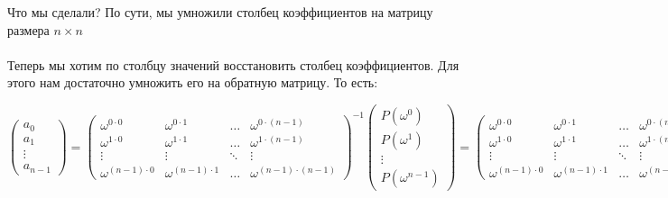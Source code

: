 Что мы сделали? По сути, мы умножили столбец коэффициентов на матрицу размера $n\times n$
\\
\\
Теперь мы хотим по столбцу значений восстановить столбец коэффициентов. Для этого нам достаточно умножить его на обратную матрицу. То есть: 
\begin{center}
 $\left( \begin{matrix} a_0 \\ a_1 \\ \vdots \\ a_{n-1} \end{matrix}\right)  = \left( \begin{matrix} \omega^{0 \cdot 0} & \omega^{0 \cdot 1} & \dots & \omega^{0 \cdot (n - 1)} \\ \omega^{1 \cdot 0} & \omega^{1 \cdot 1} & \dots & \omega^{1 \cdot (n - 1)} \\ \vdots & \vdots & \ddots & \vdots \\ \omega^{(n - 1) \cdot 0} & \omega^{(n - 1) \cdot 1} & \dots & \omega^{(n - 1) \cdot (n - 1)}   \end{matrix} \right)^{-1}\left( \begin{matrix} P(\omega^0) \\P(\omega^1) \\ \vdots \\ P(\omega^{n-1}) \end{matrix}\right) = \left( \begin{matrix} \omega^{0 \cdot 0} & \omega^{0 \cdot 1} & \dots & \omega^{0 \cdot (n - 1)} \\ \omega^{1 \cdot 0} & \omega^{1 \cdot 1} & \dots & \omega^{1 \cdot (n - 1)} \\ \vdots & \vdots & \ddots & \vdots \\ \omega^{(n - 1) \cdot 0} & \omega^{(n - 1) \cdot 1} & \dots & \omega^{(n - 1) \cdot (n - 1)}   \end{matrix} \right)^{-1}\left( \begin{matrix} c_0 \\c_1 \\ \vdots \\ c_{n-1} \end{matrix}\right)$
 \end{center}
 
